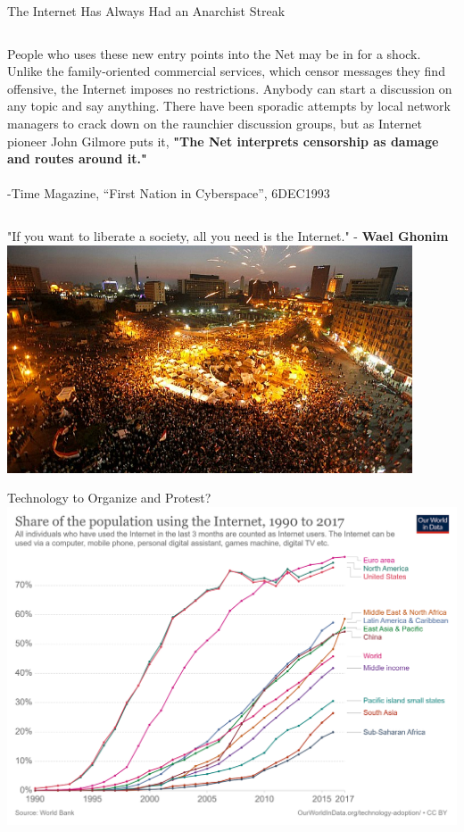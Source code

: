 \documentclass[nobackground,dvipsnames,table,aspectratio=169]{beamer}
\begin{document}
\begin{frame}{The Internet Has Always Had an Anarchist Streak}
\begin{columns}[c]
            People who uses these new entry points into the Net may be in for a shock. Unlike the family-oriented commercial services, which censor messages they find offensive, the Internet imposes no restrictions. Anybody can start a discussion on any topic and say anything. There have been sporadic attempts by local network managers to crack down on the raunchier discussion groups, but as Internet pioneer John Gilmore puts it, \textbf{"The Net interprets censorship as damage and routes around it."}\\~\\
            
            -Time Magazine, “First Nation in Cyberspace”, 6DEC1993
    \end{columns}
\end{frame}

\begin{frame}{"If you want to liberate a society, all you need is the Internet." - \textbf{Wael Ghonim}}
    \centering
    \includegraphics[width=0.9\textwidth]{protest}
\end{frame}

\begin{frame}{Technology to Organize and Protest?}
    \centering
    \includegraphics[height=0.85\textheight]{percent-using-internet}
\end{frame}
\end{document}
